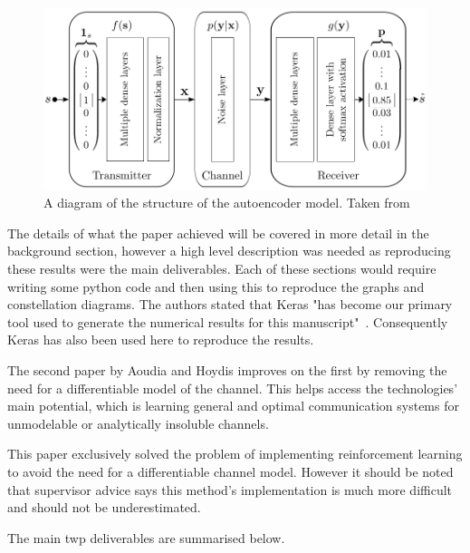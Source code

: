 \documentclass[12pt,onecolumn,letterpaper]{article}
\begin{document}
\begin{figure}[t]
\begin{center}
   \includegraphics[width=0.8\linewidth]{figures/oShea_autoencoder_layout.PNG}
\end{center}
   \caption{A diagram of the structure of the autoencoder model. Taken from~\cite{oShea}}
\label{fig:oSheaAutoencoderLayout}
\end{figure}

The details of what the paper achieved will be covered in more detail in the background section, however a high level description was needed as reproducing these results were the main deliverables. Each of these sections would require writing some python code and then using this to reproduce the graphs and constellation diagrams. The authors stated that Keras "has become our primary tool used to generate the numerical results for this manuscript"~\cite{oShea}. Consequently Keras has also been used here to reproduce the results.

The second paper by Aoudia and Hoydis improves on the first by removing the need for a differentiable model of the channel. This helps access the technologies' main potential, which is learning general and optimal communication systems for unmodelable or analytically insoluble channels. 

This paper exclusively solved the problem of implementing reinforcement learning to avoid the need for a differentiable channel model. However it should be noted that supervisor advice says this method's implementation is much more difficult and should not be underestimated.

The main twp deliverables are summarised below.
\end{document}
